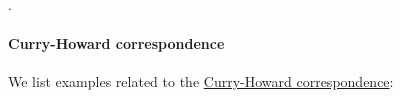 \begin{definition}\label{def:product_type}
\end{definition}

\begin{definition}\label{def:sum_type}
\end{definition}

\begin{concept}\label{con:dependent_types}

  .
\end{concept}

\begin{concept}\label{con:homotopy_type_theory}
\end{concept}

\paragraph{Curry-Howard correspondence}\hfill

\begin{example}\label{ex:con:curry_howard_correspondence}
  We list examples related to the \hyperref[con:curry_howard_correspondence]{Curry-Howard correspondence}:
  \begin{thmenum}
  \end{thmenum}
\end{example}

\begin{algorithm}\label{alg:type_derivation_to_proof_tree}
\end{algorithm}

\begin{algorithm}\label{alg:proof_tree_to_type_derivation}
\end{algorithm}
